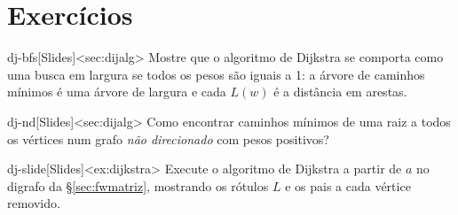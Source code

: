 \section{Exercícios}
\excurso
\begin{exercicio}{dj-bfs}[Slides]<sec:dijalg>
Mostre que o algoritmo de Dijkstra se comporta como uma busca em largura se todos os pesos são iguais a 1: a árvore de caminhos mínimos é uma árvore de largura e cada $L(w)$ é a distância em arestas.
\end{exercicio}
\begin{exercicio}{dj-nd}[Slides]<sec:dijalg>
Como encontrar caminhos mínimos de uma raiz a todos os vértices num grafo \emph{não direcionado} com pesos positivos?
\end{exercicio}
\begin{exercicio}{dj-slide}[Slides]<ex:dijkstra>
Execute o algoritmo de Dijkstra a partir de $a$ no digrafo da §\ref{sec:fwmatriz}, mostrando os rótulos $L$ e os pais a cada vértice removido.
\end{exercicio}


